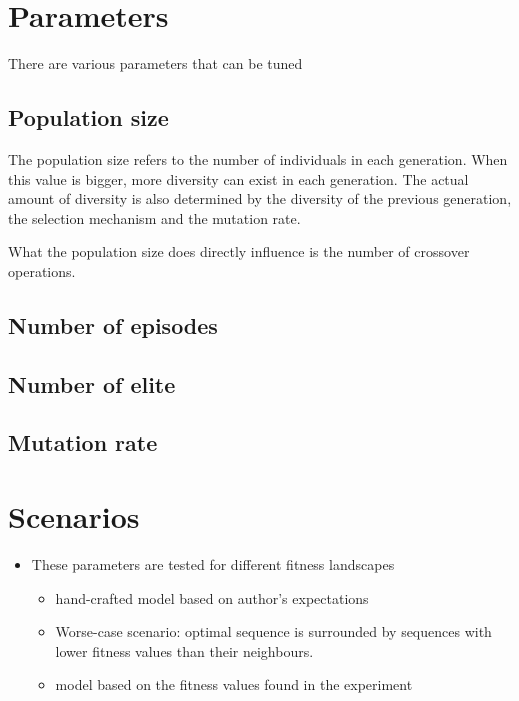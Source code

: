 \section{Parameters}
There are various parameters that can be tuned
\subsection{Population size}
The population size refers to the number of individuals in each generation.
When this value is bigger, more diversity can exist in each generation.
The actual amount of diversity is also determined by the diversity of the
previous generation, the selection mechanism and the mutation rate.

What the population size does directly influence is the number of crossover
operations.

\subsection{Number of episodes}

\subsection{Number of elite}

\subsection{Mutation rate}

\section{Scenarios}
\begin{itemize}
	\item These parameters are tested for different fitness landscapes
		\begin{itemize}
			\item hand-crafted model based on author's expectations
			\item Worse-case scenario: optimal sequence is surrounded by
				sequences with lower fitness values than their neighbours.
			\item model based on the fitness values found in the experiment
		\end{itemize}
\end{itemize}
